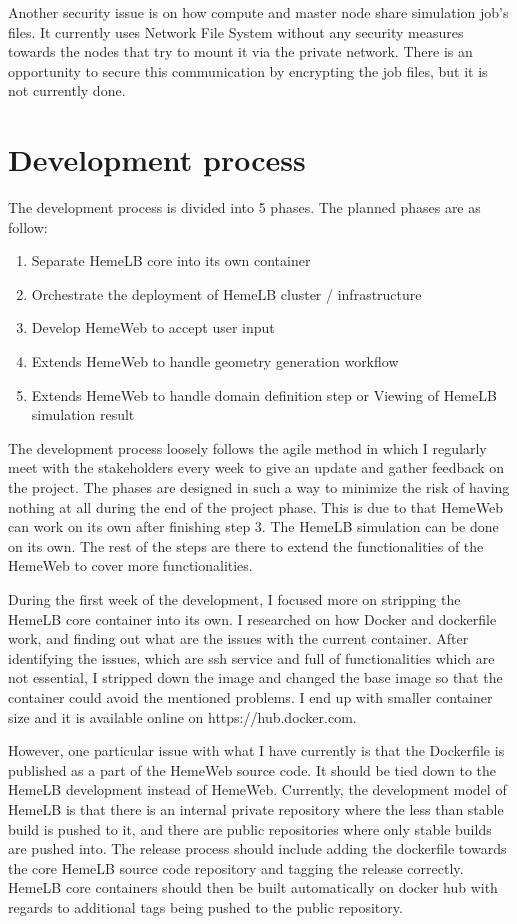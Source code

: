 Another security issue is on how compute and master node share simulation job's files. It currently uses Network File System without any security measures towards the nodes that try to mount it via the private network. There is an opportunity to secure this communication by encrypting the job files, but it is not currently done.


\section{Development process}

The development process is divided into 5 phases. The planned phases are as follow:

\begin{enumerate}
    \item{Separate HemeLB core into its own container}
    \item{Orchestrate the deployment of HemeLB cluster / infrastructure}
    \item{Develop HemeWeb to accept user input}
    \item{Extends HemeWeb to handle geometry generation workflow}
    \item{Extends HemeWeb to handle domain definition step or Viewing of HemeLB simulation result}
\end{enumerate}

The development process loosely follows the agile method in which I regularly meet with the stakeholders every week to give an update and gather feedback on the project. The phases are designed in such a way to minimize the risk of having nothing at all during the end of the project phase. This is due to that HemeWeb can work on its own after finishing step 3. The HemeLB simulation can be done on its own. The rest of the steps are there to extend the functionalities of the HemeWeb to cover more functionalities.

During the first week of the development, I focused more on stripping the HemeLB core container into its own. I researched on how Docker and dockerfile work, and finding out what are the issues with the current container. After identifying the issues, which are ssh service and full of functionalities which are not essential, I stripped down the image and changed the base image so that the container could avoid the mentioned problems. I end up with smaller container size and it is available online on https://hub.docker.com.

However, one particular issue with what I have currently is that the Dockerfile is published as a part of the HemeWeb source code. It should be tied down to the HemeLB development instead of HemeWeb. Currently, the development model of HemeLB is that there is an internal private repository where the less than stable build is pushed to it, and there are public repositories where only stable builds are pushed into. The release process should include adding the dockerfile towards the core HemeLB source code repository and tagging the release correctly. HemeLB core containers should then be built automatically on docker hub with regards to additional tags being pushed to the public repository.


